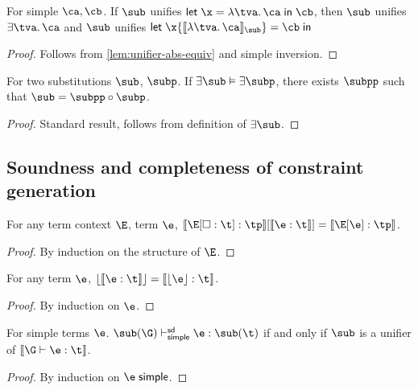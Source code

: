 \documentclass[acmsmall,screen,nonacm%
\Anonymous{,anonymous}{}%
\Final{}{,review}%
]{acmart}
\begin{document}
\begin{lemma}
  For simple $\ca, \cb$.
  If $\sub$ unifies $\clet \x \tv \ca \cb$, then
  $\sub$ unifies $\cexists \tv \ca$ and
  $\sub$ unifies $\cletin \x {\csem {\cabs \tv \ca}_\sub} \cb$
  \begin{proof}
    Follows from \cref{lem:unifier-abs-equiv} and simple inversion.
  \end{proof}
\end{lemma}

\begin{lemma}
  \label{lem:mgus}
  For two substitutions $\sub$, $\subp$. If $\exists \sub \centails \exists
  \subp$, there exists  $\subpp$ such that $\sub = \subpp \compose \subp$.
  \begin{proof}
    Standard result, follows from definition of $\exists \sub$.
  \end{proof}
\end{lemma}

\subsection{Soundness and completeness of constraint generation}

\begin{lemma}
  \label{lem:ctxt-gen-correctness}
  For any term context $\E$, term $\e$, $\ctxinfer \E \t \tp \where{\cinfer
  \e \t} = \cinfer {\E\where{\e}} \tp$.
  \begin{proof}
    By induction on the structure of $\E$.
  \end{proof}
\end{lemma}

\begin{lemma}
  \label{lem:erasure-constraint-gen}
  For any term $\e$, $\cerase {\cinfer \e \t} = \cinfer {\eerase \e} \t$.
  \begin{proof}
    By induction on $\e$.
  \end{proof}
\end{lemma}

\begin{lemma}
  \label{lem:simple-soundness-completeness}
  For simple terms $\e$.  $\sub(\G) \thsimplesd \e : \sub(\t)$ if and only
  if $\sub$ is a unifier of $\csem {\G \th \e : \t}$.
  \begin{proof}
    By induction on $\e \simple$.
  \end{proof}
\end{lemma}
\end{document}
